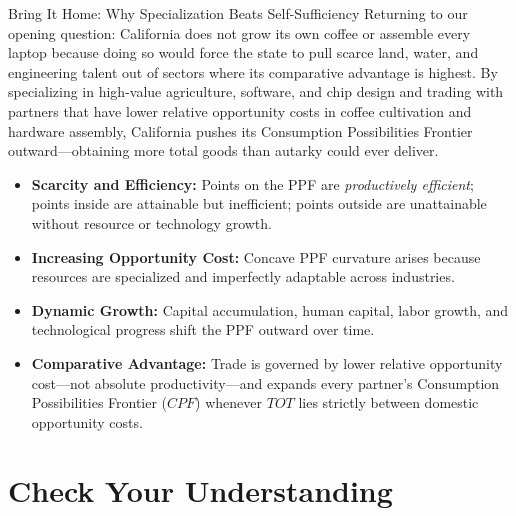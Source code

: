 \documentclass[11pt,letterpaper]{article}
\begin{document}
\begin{examplecase}{Bring It Home: Why Specialization Beats Self-Sufficiency}
Returning to our opening question: California does not grow its own coffee or assemble every laptop because doing so would force the state to pull scarce land, water, and engineering talent out of sectors where its comparative advantage is highest. By specializing in high-value agriculture, software, and chip design and trading with partners that have lower relative opportunity costs in coffee cultivation and hardware assembly, California pushes its Consumption Possibilities Frontier outward—obtaining more total goods than autarky could ever deliver.
\end{examplecase}

\begin{takeaways}
\begin{itemize}
    \item \textbf{Scarcity and Efficiency:} Points on the PPF are \emph{productively efficient}; points inside are attainable but inefficient; points outside are unattainable without resource or technology growth.
    \item \textbf{Increasing Opportunity Cost:} Concave PPF curvature arises because resources are specialized and imperfectly adaptable across industries.
    \item \textbf{Dynamic Growth:} Capital accumulation, human capital, labor growth, and technological progress shift the PPF outward over time.
    \item \textbf{Comparative Advantage:} Trade is governed by lower relative opportunity cost—not absolute productivity—and expands every partner's Consumption Possibilities Frontier ($CPF$) whenever $TOT$ lies strictly between domestic opportunity costs.
\end{itemize}
\end{takeaways}

\section*{Check Your Understanding}
\end{document}

